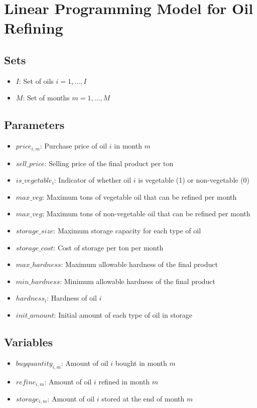\documentclass{article}
\begin{document}
\section*{Linear Programming Model for Oil Refining}

\subsection*{Sets}
\begin{itemize}
    \item \(I\): Set of oils \(i = 1, \ldots, I\)
    \item \(M\): Set of months \(m = 1, \ldots, M\)
\end{itemize}

\subsection*{Parameters}
\begin{itemize}
    \item \(price_{i,m}\): Purchase price of oil \(i\) in month \(m\)
    \item \(sell\_price\): Selling price of the final product per ton
    \item \(is\_vegetable_{i}\): Indicator of whether oil \(i\) is vegetable (1) or non-vegetable (0)
    \item \(max\_veg\): Maximum tons of vegetable oil that can be refined per month
    \item \(max\_veg\): Maximum tons of non-vegetable oil that can be refined per month
    \item \(storage\_size\): Maximum storage capacity for each type of oil
    \item \(storage\_cost\): Cost of storage per ton per month
    \item \(max\_hardness\): Maximum allowable hardness of the final product
    \item \(min\_hardness\): Minimum allowable hardness of the final product
    \item \(hardness_{i}\): Hardness of oil \(i\)
    \item \(init\_amount\): Initial amount of each type of oil in storage
\end{itemize}

\subsection*{Variables}
\begin{itemize}
    \item \(buyquantity_{i,m}\): Amount of oil \(i\) bought in month \(m\)
    \item \(refine_{i,m}\): Amount of oil \(i\) refined in month \(m\)
    \item \(storage_{i,m}\): Amount of oil \(i\) stored at the end of month \(m\)
\end{itemize}
\end{document}

